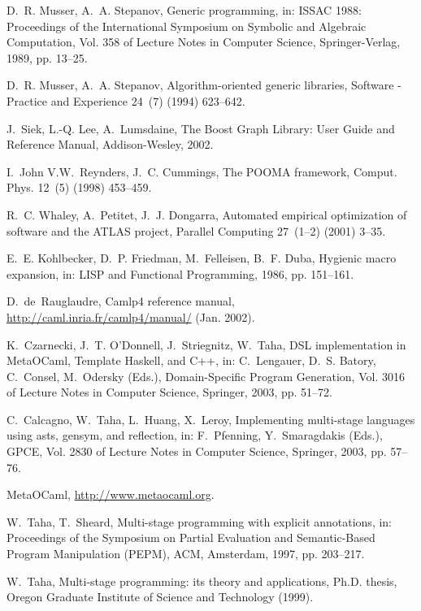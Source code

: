 \documentclass{elsart}
\begin{document}
\begin{thebibliography}{10}
D.~R. Musser, A.~A. Stepanov, Generic programming, in: {ISSAC 1988}:
  Proceedings of the International Symposium on Symbolic and Algebraic
  Computation, Vol. 358 of Lecture Notes in Computer Science, Springer-Verlag,
  1989, pp. 13--25.

D.~R. Musser, A.~A. Stepanov, Algorithm-oriented generic libraries, Software -
  Practice and Experience 24~(7) (1994) 623--642.

J.~Siek, L.-Q. Lee, A.~Lumsdaine, The Boost Graph Library: User Guide and
  Reference Manual, Addison-Wesley, 2002.

I.~John V.W.~Reynders, J.~C. Cummings, The {POOMA} framework, Comput. Phys.
  12~(5) (1998) 453--459.

R.~C. Whaley, A.~Petitet, J.~J. Dongarra, Automated empirical optimization of
  software and the {ATLAS} project, Parallel Computing 27~(1--2) (2001) 3--35.

E.~E. Kohlbecker, D.~P. Friedman, M.~Felleisen, B.~F. Duba, Hygienic macro
  expansion, in: LISP and Functional Programming, 1986, pp. 151--161.

D.~de~Rauglaudre, Camlp4 reference manual,
  \url{http://caml.inria.fr/camlp4/manual/} (Jan. 2002).

K.~Czarnecki, J.~T. O'Donnell, J.~Striegnitz, W.~Taha, {DSL} implementation in
  {MetaOCaml}, {Template Haskell}, and {C++}, in: C.~Lengauer, D.~S. Batory,
  C.~Consel, M.~Odersky (Eds.), Domain-Specific Program Generation, Vol. 3016
  of Lecture Notes in Computer Science, Springer, 2003, pp. 51--72.

C.~Calcagno, W.~Taha, L.~Huang, X.~Leroy, Implementing multi-stage languages
  using asts, gensym, and reflection, in: F.~Pfenning, Y.~Smaragdakis (Eds.),
  GPCE, Vol. 2830 of Lecture Notes in Computer Science, Springer, 2003, pp.
  57--76.

{MetaOCaml}, \url{http://www.metaocaml.org}.

W.~Taha, T.~Sheard, Multi-stage programming with explicit annotations, in:
  Proceedings of the Symposium on Partial Evaluation and Semantic-Based Program
  Manipulation {(PEPM)}, ACM, Amsterdam, 1997, pp. 203--217.

W.~Taha, Multi-stage programming: its theory and applications, Ph.D. thesis,
  Oregon Graduate Institute of Science and Technology (1999).


\end{thebibliography}
\end{document}
